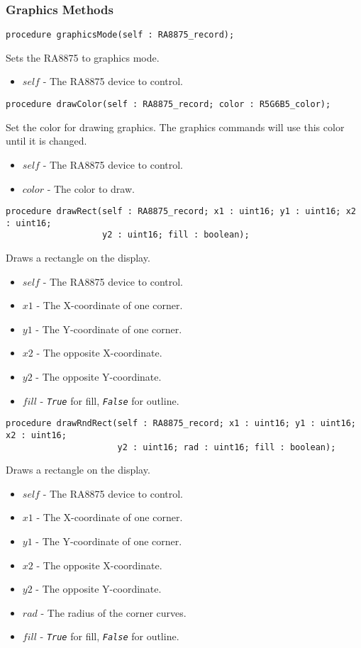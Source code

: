 \documentclass[10pt, openany]{book}
\newcommand{\constant}[1]{\emph{\texttt{#1}}}
\begin{document}
\subsubsection{Graphics Methods}
\begin{lstlisting}
procedure graphicsMode(self : RA8875_record);
\end{lstlisting}
Sets the RA8875 to graphics mode.
\begin{itemize}
  \item $self$ - The RA8875 device to control.
\end{itemize}

\begin{lstlisting}
procedure drawColor(self : RA8875_record; color : R5G6B5_color);
\end{lstlisting}
Set the color for drawing graphics.  The graphics commands will use this color until it is changed.
\begin{itemize}
  \item $self$ - The RA8875 device to control.
  \item $color$ - The color to draw.
\end{itemize}

\begin{lstlisting}
procedure drawRect(self : RA8875_record; x1 : uint16; y1 : uint16; x2 : uint16;
                   y2 : uint16; fill : boolean);
\end{lstlisting}
Draws a rectangle on the display.
\begin{itemize}
  \item $self$ - The RA8875 device to control.
  \item $x1$ - The X-coordinate of one corner.
  \item $y1$ - The Y-coordinate of one corner.
  \item $x2$ - The opposite X-coordinate.
  \item $y2$ - The opposite Y-coordinate.
  \item $fill$ - \constant{True} for fill, \constant{False} for outline.
\end{itemize}

\begin{lstlisting}
procedure drawRndRect(self : RA8875_record; x1 : uint16; y1 : uint16; x2 : uint16;
                      y2 : uint16; rad : uint16; fill : boolean);
\end{lstlisting}
Draws a rectangle on the display.
\begin{itemize}
  \item $self$ - The RA8875 device to control.
  \item $x1$ - The X-coordinate of one corner.
  \item $y1$ - The Y-coordinate of one corner.
  \item $x2$ - The opposite X-coordinate.
  \item $y2$ - The opposite Y-coordinate.
  \item $rad$ - The radius of the corner curves.
  \item $fill$ - \constant{True} for fill, \constant{False} for outline.
\end{itemize}
\end{document}

